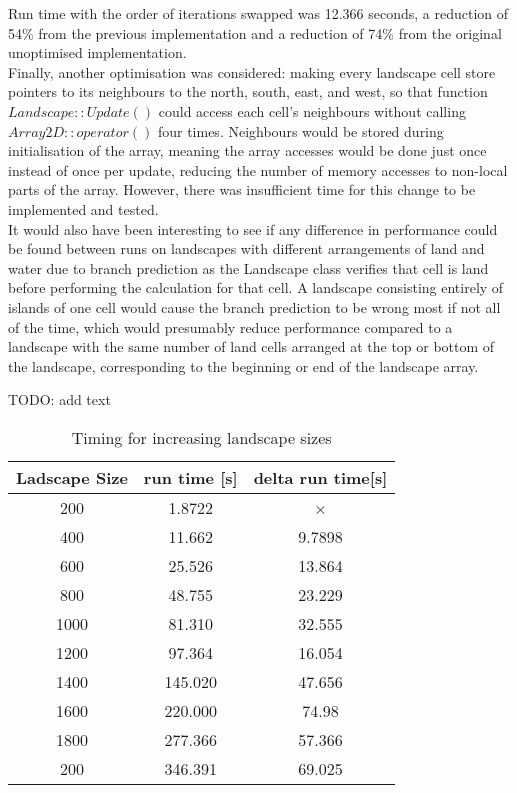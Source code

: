 Run time with the order of iterations swapped was 12.366 seconds, a reduction of 54\% from the previous implementation and a reduction of 74\% from the original unoptimised implementation.\\

Finally, another optimisation was considered: making every landscape cell store pointers to its neighbours to the north, south, east, and west, so that function $Landscape::Update()$ could access each cell's neighbours without calling $Array2D::operator()$ four times.
Neighbours would be stored during initialisation of the array, meaning the array accesses would be done just once instead of once per update, reducing the number of memory accesses to non-local parts of the array.
However, there was insufficient time for this change to be implemented and tested.\\

It would also have been interesting to see if any difference in performance could be found between runs on landscapes with different arrangements of land and water due to branch prediction as the Landscape class verifies that cell is land before performing the calculation for that cell.
A landscape consisting entirely of islands of one cell would cause the branch prediction to be wrong most if not all of the time, which would presumably reduce performance compared to a landscape with the same number of land cells arranged at the top or bottom of the landscape, corresponding to the beginning or end of the landscape array.




\label{performance of the optimied code}

TODO: add text 

\begin{table}
\caption{Timing for increasing landscape sizes}
\label{tab: Size timing}
 \begin{center}
\begin{tabular}{|c|c|c|}
\hline
Ladscape Size & run time [s] & delta run time[s]\\
\hline
200 & 1.8722 & ×\\
\hline
400 & 11.662 & 9.7898\\
\hline
600 & 25.526 & 13.864\\
\hline
800 & 48.755 & 23.229\\
\hline
1000 & 81.310 & 32.555\\
\hline
1200 & 97.364 & 16.054\\
\hline
1400 & 145.020 & 47.656\\
\hline
1600 & 220.000 & 74.98\\
\hline
1800 & 277.366 & 57.366\\
\hline
200 & 346.391 & 69.025\\
\hline
\end{tabular}
\end{center}
\end{table}




